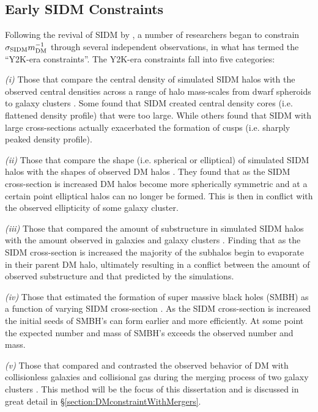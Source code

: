 \subsection{Early SIDM Constraints}\label{section:EarlySIDMconstraints}

Following the revival of SIDM by \citet{Spergel:2000cb}, a number of researchers began to constrain $\sigma_{\rm SIDM}m_{\rm DM}^{-1}$ through several independent observations, in what \citet{Peter:2012vi} has termed the ``Y2K-era constraints''.
The Y2K-era constraints fall into five categories:

\textit{(i)} Those that compare the central density of simulated SIDM halos with the observed central densities across a range of halo mass-scales from dwarf spheroids to galaxy clusters \citep{Hogan:2000ih, Kochanek:2000iw, Yoshida:2000bd, Yoshida:2000gn, Dave:2001hh, Dalcanton:2001jj, Meneghetti:2001en, Colin:2002ku}.
Some found that SIDM created central density cores (i.e. flattened density profile) that were too large.
While others found that SIDM with large cross-sections actually exacerbated the formation of cusps (i.e. sharply peaked density profile).

\textit{(ii)} Those that compare the shape (i.e. spherical or elliptical) of simulated SIDM halos with the shapes of observed DM halos \citep{Yoshida:2000bd, Dave:2001hh, MiraldaEscude:2002ev}.
They found that as the SIDM cross-section is increased DM halos become more spherically symmetric and at a certain point elliptical halos can no longer be formed.
This is then in conflict with the observed ellipticity of some galaxy cluster.

\textit{(iii)} Those that compared the amount of substructure in simulated SIDM halos with the amount observed in galaxies and galaxy clusters \citep{Hogan:2000ih, Yoshida:2000bd, Gnedin:2001gd, Colin:2002ku}.
Finding that as the SIDM cross-section is increased the majority of the subhalos begin to evaporate in their parent DM halo, ultimately resulting in a conflict between the amount of observed substructure and that predicted by the simulations.

\textit{(iv)} Those that estimated the formation of super massive black holes (SMBH) as a function of varying SIDM cross-section \citep{Hennawi:2002kv}.
As the SIDM cross-section is increased the initial seeds of SMBH's can form earlier and more efficiently. 
At some point the expected number and mass of SMBH's exceeds the observed number and mass.

\textit{(v)} Those that compared and contrasted the observed behavior of DM with collisionless galaxies and collisional gas during the merging process of two galaxy clusters \citep{Markevitch:2004dl}.
This method will be the focus of this dissertation and is discussed in great detail in \S\ref{section:DMconstraintWithMergers}.

